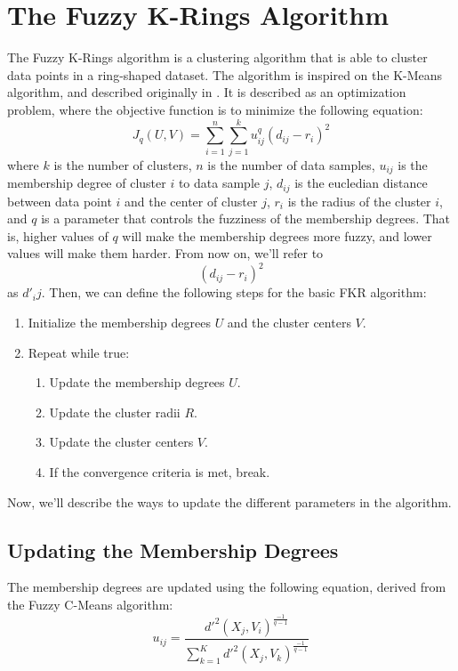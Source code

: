 \documentclass[conference]{IEEEtran}
\begin{document}
\section{The Fuzzy K-Rings Algorithm}
The Fuzzy K-Rings algorithm is a clustering algorithm that is able to cluster data points in a ring-shaped dataset.
The algorithm is inspired on the K-Means algorithm, and described originally in \cite{b1}.
It is described as an optimization problem, where the objective function is to minimize the following equation:
\begin{equation}\label{eq:objective}
J_q(U, V) = \sum_{i=1}^{n} \sum_{j=1}^{k} u_{ij}^q (d_{ij} - r_i)^2
\end{equation}
where $k$ is the number of clusters, $n$ is the number of data samples, $u_{ij}$ is the membership degree of cluster $i$ to data sample $j$, $d_{ij}$ is the eucledian distance between data point $i$ and the center of cluster $j$, $r_i$ is the radius of the cluster $i$, and $q$ is a parameter that controls the fuzziness of the membership degrees.
That is, higher values of $q$ will make the membership degrees more fuzzy, and lower values will make them harder.
From now on, we'll refer to $$(d_{ij} - r_i)^2$$ as $d'_ij$.
Then, we can define the following steps for the basic FKR algorithm:
\begin{enumerate}
    \item Initialize the membership degrees $U$ and the cluster centers $V$.
    \item Repeat while true:
    \begin{enumerate}
        \item Update the membership degrees $U$.
        \item Update the cluster radii $R$.
        \item Update the cluster centers $V$.
        \item If the convergence criteria is met, break.
    \end{enumerate}
\end{enumerate}

Now, we'll describe the ways to update the different parameters in the algorithm.

\subsection{Updating the Membership Degrees}
The membership degrees are updated using the following equation, derived from the Fuzzy C-Means algorithm:
\begin{equation}
u_{ij} = \frac{d'^2(X_j, V_i)^{\frac{-1}{q-1}}}{\sum_{k=1}^{K} d'^2(X_j, V_k)^{\frac{-1}{q-1}}}
\end{equation}
\end{document}
